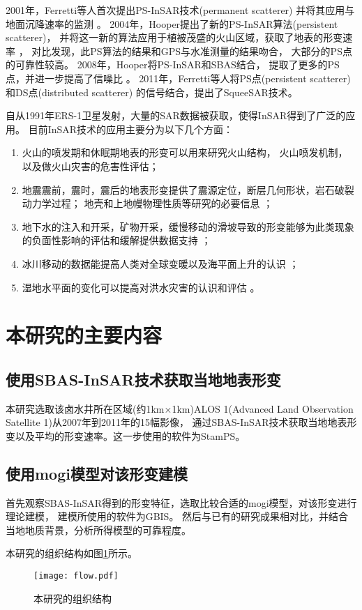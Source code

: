 2001年，Ferretti等人首次提出PS-InSAR技术(permanent scatterer)
\cite{ferrettiPermanentScatterersSAR2001}
并将其应用与地面沉降速率的监测
\cite{ferrettiNonlinearSubsidenceRate2000}。
2004年，Hooper提出了新的PS-InSAR算法(persistent scatterer)，
并将这一新的算法应用于植被茂盛的火山区域，获取了地表的形变速率
\cite{hooperNewMethodMeasuring2004}，
对比发现，此PS算法的结果和GPS与水准测量的结果吻合，
大部分的PS点的可靠性较高。
2008年，Hooper将PS-InSAR和SBAS结合，
提取了更多的PS点，并进一步提高了信噪比
\cite{hooperMultitemporalInSARMethod2008}。
2011年，Ferretti等人将PS点(persistent scatterer)和DS点(distributed scatterer)
的信号结合，提出了SqueeSAR技术。

自从1991年ERS-1卫星发射，大量的SAR数据被获取，使得InSAR得到了广泛的应用。
目前InSAR技术的应用主要分为以下几个方面：
\begin{enumerate}
  \item 火山的喷发期和休眠期地表的形变可以用来研究火山结构，
  火山喷发机制，以及做火山灾害的危害性评估\cite{luInSARImagingVolcanic2007}；
  \item 地震震前，震时，震后的地表形变提供了震源定位，断层几何形状，岩石破裂动力学过程；
  地壳和上地幔物理性质等研究的必要信息
  \cite{massonnetDisplacementFieldLanders1993,biggsMultiinterferogramMethodMeasuring2007}；
  \item 地下水的注入和开采，矿物开采，缓慢移动的滑坡导致的形变能够为此类现象的负面性影响的评估和缓解提供数据支持
  \cite{zhangMappingGroundSurface2012,zhaoLargeareaLandslideDetection2012}；
  \item 冰川移动的数据能提高人类对全球变暖以及海平面上升的认识
  \cite{rignotMassBalancePolar2002}；
  \item 湿地水平面的变化可以提高对洪水灾害的认识和评估
  \cite{luRadarsat1ERSInSAR2008}。
\end{enumerate}

\section{本研究的主要内容}

\subsection{使用SBAS-InSAR技术获取当地地表形变}
本研究选取该卤水井所在区域(约1km×1km)ALOS 1(Advanced Land Observation Satellite 1)从2007年到2011年的15幅影像，
通过SBAS-InSAR技术获取当地地表形变以及平均的形变速率。这一步使用的软件为StamPS。


\subsection{使用mogi模型对该形变建模}
首先观察SBAS-InSAR得到的形变特征，选取比较合适的mogi模型，对该形变进行理论建模，
建模所使用的软件为GBIS。
然后与已有的研究成果相对比，并结合当地地质背景，分析所得模型的可靠程度。

本研究的组织结构如图\ref{fig:flow}所示。
\begin{figure}[htb]
  \centering
  \texttt{[image: flow.pdf]}
  \caption{本研究的组织结构}
  \label{fig:flow}
\end{figure}